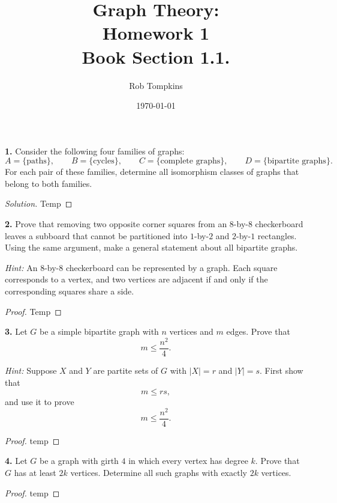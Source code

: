 \documentclass[12pt]{amsart}
\title{Graph Theory:\\Homework 1\\ Book Section 1.1.}
\author{Rob Tompkins}
\date{\today}
\theoremstyle{conjecture}
\theoremstyle{definition}
\theoremstyle{question}
\theoremstyle{theorem}
\newenvironment{solution}
{\begin{proof}[Solution]}
{\end{proof}}
\begin{document}
    \maketitle

    \textbf{1.} Consider the following four families of graphs:
    \[
        A=\{\text{paths}\}, \qquad
        B=\{\text{cycles}\}, \qquad
        C=\{\text{complete graphs}\}, \qquad
        D=\{\text{bipartite graphs}\}.
    \]
    For each pair of these families, determine all isomorphism classes of
    graphs that belong to both families.

    \begin{solution}
        Temp
    \end{solution}

    \textbf{2.} Prove that removing two opposite corner squares from an
    $8$-by-$8$ checkerboard leaves a subboard that cannot be partitioned
    into $1$-by-$2$ and $2$-by-$1$ rectangles. Using the same argument,
    make a general statement about all bipartite graphs.

    \medskip

    \noindent
    \textit{Hint:} An $8$-by-$8$ checkerboard can be represented by a graph.
    Each square corresponds to a vertex, and two vertices are adjacent if
    and only if the corresponding squares share a side.

    \begin{proof}
        Temp
    \end{proof}

    \textbf{3.} Let $G$ be a simple bipartite graph with $n$ vertices and $m$
    edges. Prove that
    \[
        m \leq \frac{n^2}{4}.
    \]

    \medskip

    \noindent
    \textit{Hint:} Suppose $X$ and $Y$ are partite sets of $G$ with
    $|X|=r$ and $|Y|=s$. First show that
    \[
        m \leq rs,
    \]
    and use it to prove
    \[
        m \leq \frac{n^2}{4}.
    \]

    \begin{proof}
        temp
    \end{proof}

    \textbf{4.} Let $G$ be a graph with girth $4$ in which every vertex has
    degree $k$. Prove that $G$ has at least $2k$ vertices. Determine all
    such graphs with exactly $2k$ vertices.

    \begin{proof}
        temp
    \end{proof}
\end{document}
